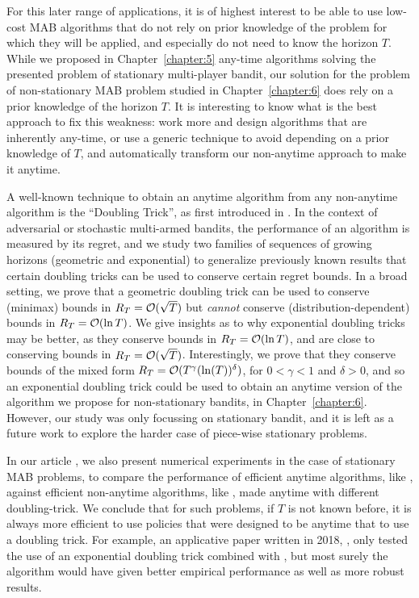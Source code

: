 For this later range of applications, it is of highest interest to be able to use low-cost MAB algorithms that do not rely on prior knowledge of the problem for which they will be applied, and especially do not need to know the horizon $T$.
While we proposed in Chapter~\ref{chapter:5} any-time algorithms solving the presented problem of stationary multi-player bandit, our solution for the problem of non-stationary MAB problem studied in Chapter~\ref{chapter:6} does rely on a prior knowledge of the horizon $T$.
It is interesting to know what is the best approach to fix this weakness: work more and design algorithms that are inherently any-time, or use a generic technique to avoid depending on a prior knowledge of $T$, and automatically transform our non-anytime approach to make it anytime.

A well-known technique to obtain an anytime algorithm from any non-anytime algorithm is the ``Doubling Trick'', as first introduced in \cite{CesaLugosi06}.
%
In the context of adversarial or stochastic multi-armed bandits,
the performance of an algorithm is measured by its regret,
and we study two families of sequences of growing horizons (geometric and exponential)
to generalize previously known results that certain doubling tricks can be used to conserve certain regret bounds.
In a broad setting, we prove that a geometric doubling trick can be used to conserve (minimax) bounds in $R_T = \mathcal{O}(\sqrt{T})$ but \emph{cannot} conserve (distribution-dependent) bounds in $R_T = \mathcal{O}(\ln T)$.
We give insights as to why exponential doubling tricks may be better, as they conserve bounds in $R_T = \mathcal{O}(\ln T)$, and are close to conserving bounds in $R_T = \mathcal{O}(\sqrt{T})$.
Interestingly, we prove that they conserve bounds of the mixed form $R_T = \mathcal{O}(T^{\gamma} (\ln(T))^{\delta})$, for $0<\gamma<1$ and $\delta>0$, and so an exponential doubling trick could be used to obtain an anytime version of the algorithm we propose for non-stationary bandits, \GLRklUCB{} in Chapter~\ref{chapter:6}.
However, our study was only focussing on stationary bandit, and it is left as a future work to explore the harder case of piece-wise stationary problems.

In our article \cite{Besson2018DoublingTricks}, we also present numerical experiments in the case of stationary MAB problems, to compare the performance of efficient anytime algorithms, like \klUCB, against efficient non-anytime algorithms, like \KLUCBpp, made anytime with different doubling-trick.
We conclude that for such problems, if $T$ is not known before, it is always more efficient to use policies that were designed to be anytime that to use a doubling trick.
For example, an applicative paper written in 2018, \cite{li2019useDoublingTrick}, only tested the use of an exponential doubling trick combined with \KLUCBpp, but most surely the \klUCB{} algorithm would have given better empirical performance as well as more robust results.

